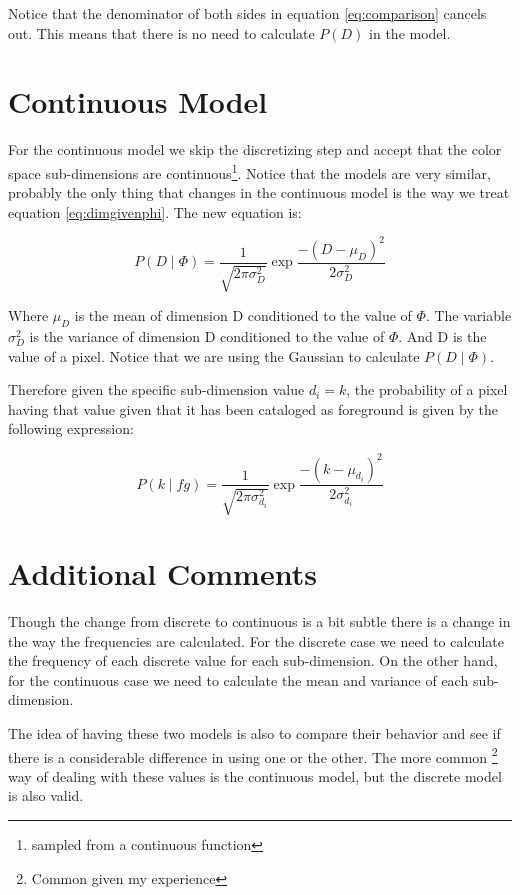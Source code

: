 \documentclass[a4paper,12pt]{report}
\begin{document}
Notice that the denominator of both sides in equation \ref{eq:comparison}
cancels out. This means that there is no need to calculate $P(D)$ in the model.

\section{Continuous Model}
For the continuous model we skip the discretizing step and accept that the
color space sub-dimensions are continuous\footnote{sampled from
a continuous function}. Notice that the models are very similar, probably the
only thing that changes in the continuous model is the way we treat equation
\ref{eq:dimgivenphi}. The new equation is:

\begin{equation}\label{eq:dimgivenphigauss}
    P(D \mid \Phi) = \frac{1}{\sqrt{2 \pi \sigma_D^2}}
                       \exp{\frac{-(D - \mu_D)^2}{2 \sigma_D^2}}
\end{equation}

Where $\mu_D$ is the mean of dimension D conditioned to the value of $\Phi$. The
variable $\sigma_D^2$ is the variance of dimension D conditioned to the value of
$\Phi$. And D is the value of a pixel. Notice that we are using the Gaussian to
calculate $P(D \mid \Phi)$.

Therefore given the specific sub-dimension value $d_i=k$, the probability of a
pixel having that value given that it has been cataloged as foreground is given
by the following expression:

\begin{equation}\label{eq:dimgivenphigauss}
    P(k \mid fg) = \frac{1}{\sqrt{2 \pi \sigma_{d_i}^2}}
                   \exp{\frac{-(k - \mu_{d_i})^2}{2 \sigma_{d_i}^2}}
\end{equation}

\section{Additional Comments}
Though the change from discrete to continuous is a bit subtle there is a change
in the way the frequencies are calculated. For the discrete case we need to
calculate the frequency of each discrete value for each sub-dimension. On the
other hand, for the continuous case we need to calculate the mean and variance
of each sub-dimension.

The idea of having these two models is also to compare their behavior and see if
there is a considerable difference in using one or the other. The more common
\footnote{Common given my experience} way of dealing with these values is the
continuous model, but the discrete model is also valid.

\listoffixmes
\end{document}
